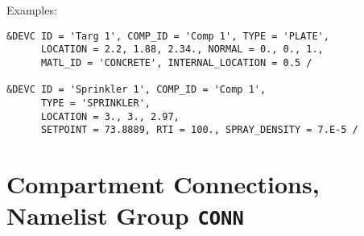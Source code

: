 
\vspace{\baselineskip}
\noindent Examples:
\begin{lstlisting}
&DEVC ID = 'Targ 1', COMP_ID = 'Comp 1', TYPE = 'PLATE',
      LOCATION = 2.2, 1.88, 2.34., NORMAL = 0., 0., 1.,
      MATL_ID = 'CONCRETE', INTERNAL_LOCATION = 0.5 /

&DEVC ID = 'Sprinkler 1', COMP_ID = 'Comp 1',
      TYPE = 'SPRINKLER',
      LOCATION = 3., 3., 2.97,
      SETPOINT = 73.8889, RTI = 100., SPRAY_DENSITY = 7.E-5 /
\end{lstlisting}



\clearpage
\section{Compartment Connections, Namelist Group \texorpdfstring{{\tt CONN}}{CONN}}

